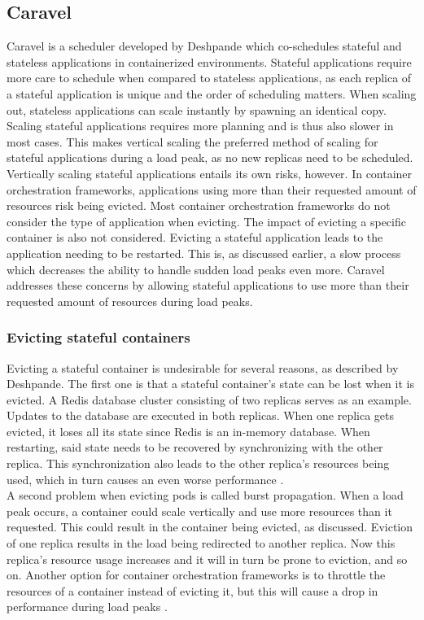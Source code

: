 \subsection{Caravel}
\label{caravel}
Caravel \citep{caravel} is a scheduler developed by Deshpande which co-schedules stateful and stateless applications in containerized environments. Stateful applications require more care to schedule when compared to stateless applications, as each replica of a stateful application is unique and the order of scheduling matters. When scaling out, stateless applications can scale instantly by spawning an identical copy. Scaling stateful applications requires more planning and is thus also slower in most cases. This makes vertical scaling the preferred method of scaling for stateful applications during a load peak, as no new replicas need to be scheduled. Vertically scaling stateful applications entails its own risks, however. In container orchestration frameworks, applications using more than their requested amount of resources risk being evicted. Most container orchestration frameworks do not consider the type of application when evicting. The impact of evicting a specific container is also not considered. Evicting a stateful application leads to the application needing to be restarted. This is, as discussed earlier, a slow process which decreases the ability to handle sudden load peaks even more. Caravel addresses these concerns by allowing stateful applications to use more than their requested amount of resources during load peaks.

\subsubsection{Evicting stateful containers}
Evicting a stateful container is undesirable for several reasons, as described by Deshpande. The first one is that a stateful container's state can be lost when it is evicted. A Redis \citep{redis} database cluster consisting of two replicas serves as an example. Updates to the database are executed in both replicas. When one replica gets evicted, it loses all its state since Redis is an in-memory database. When restarting, said state needs to be recovered by synchronizing with the other replica. This synchronization also leads to the other replica's resources being used, which in turn causes an even worse performance \citep{caravel}. \\

A second problem when evicting pods is called burst propagation. When a load peak occurs, a container could scale vertically and use more resources than it requested. This could result in the container being evicted, as discussed. Eviction of one replica results in the load being redirected to another replica. Now this replica's resource usage increases and it will in turn be prone to eviction, and so on. Another option for container orchestration frameworks is to throttle the resources of a container instead of evicting it, but this will cause a drop in performance during load peaks \citep{caravel}.\\

